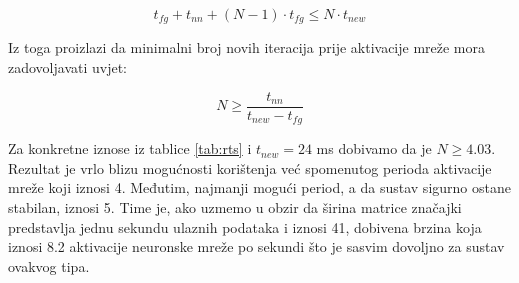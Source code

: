 \begin{equation}
    t_{fg} + t_{nn} + (N - 1) \cdot t_{fg} \leq N \cdot t_{new}
\end{equation}

Iz toga proizlazi da minimalni broj novih iteracija prije aktivacije mreže mora zadovoljavati
uvjet:

\begin{equation}
    N \geq \frac{t_{nn}}{t_{new} - t_{fg}}
\end{equation}

Za konkretne iznose iz tablice \ref{tab:rts} i $t_{new} = 24$ ms dobivamo da je 
$N \geq 4.03$. Rezultat je vrlo blizu mogućnosti korištenja već spomenutog
perioda aktivacije mreže koji iznosi 4. Međutim, najmanji mogući period, a da sustav 
sigurno ostane stabilan, iznosi 5. Time je, ako uzmemo u obzir da širina matrice značajki 
predstavlja jednu sekundu ulaznih podataka i iznosi 41, dobivena brzina koja iznosi
8.2 aktivacije neuronske mreže po sekundi što je sasvim dovoljno za sustav ovakvog tipa.

